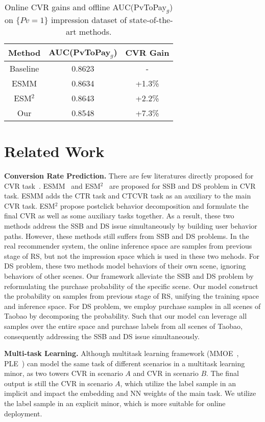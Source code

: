 \documentclass[sigconf]{acmart}
\begin{document}
\begin{table}
\centering
\caption{Online CVR gains and offline AUC(PvToPay$_g$) on $\{Pv=1\}$ impression dataset of state-of-the-art methods.}
\label{tab:auc1}
\vskip -8pt
\begin{tabular}{c|c|c}
\hline
Method & AUC(PvToPay$_g$) & CVR Gain\\
\hline
Baseline & 0.8623 & - \\
ESMM & 0.8634 & +1.3\% \\
ESM$^2$ & 0.8643 & +2.2\% \\
Our & 0.8548 & +7.3\%\\
\hline
\end{tabular}
\vskip -10pt
\end{table}

\section{Related Work}

\textbf{Conversion Rate Prediction.} There are few literatures directly proposed for CVR task~\cite{2018ESMM,2020ESM,related16,related2016Large,related2019Multi}.
ESMM~\cite{2018ESMM} and ESM$^2$~\cite{2020ESM} are proposed for SSB and DS problem in CVR task. ESMM adds the CTR task and CTCVR task as an auxiliary to the main CVR task. ESM$^2$ propose postclick behavior decomposition and formulate the final CVR as well as some auxiliary tasks together. As a result, these two methods address the SSB and DS issue simultaneously by building user behavior paths. However, these methods still suffers from SSB and DS problems. In the real recommender system, the online inference space are samples from previous stage of RS, but not the impression space which is used in these two mehods. For DS problem, these two methods model behaviors of their own scene, ignoring  behaviors of other scenes. Our framework alleviate the SSB and DS problem by reformulating the purchase probability of the specific scene. Our model construct the probability on samples from previous stage of RS, unifying the training space and inference space. For DS problem, we employ purchase samples in all scenes of Taobao by decomposing the probability. Such that our model can leverage all samples over the entire space and purchase labels from all scenes of Taobao, consequently addressing the SSB and DS issue simultaneously. 

\textbf{Multi-task Learning.} Although multitask learning framework (MMOE~\cite{2018MMOE}, PLE~\cite{2020PLE}) can model the same task of different scenarios in a multitask learning minor, as two towers CVR in scenario $A$ and CVR in scenario $B$. The final output is still the CVR in scenario $A$, which utilize the label sample in an implicit and impact the embedding and NN weights of the main task. We utilize the label sample in an explicit minor, which is more suitable for online deployment.
\end{document}
